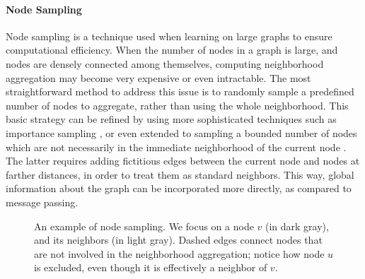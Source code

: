 \paragraph{Node Sampling}
Node sampling is a technique used when learning on large graphs to ensure computational efficiency. When the number of nodes in a graph is large, and nodes are densely connected among themselves, computing neighborhood aggregation may become very expensive or even intractable. The most straightforward method to address this issue is to randomly sample a predefined number of nodes to aggregate, rather than using the whole neighborhood. This basic strategy can be refined by using more sophisticated techniques such as importance sampling \citep{gallicchio2020fastdeepgnn}, or even extended to sampling a bounded number of nodes which are not necessarily in the immediate neighborhood of the current node \citep{hamilton2017graphsage}. The latter requires adding fictitious edges between the current node and nodes at farther distances, in order to treat them as standard neighbors. This way, global information about the graph can be incorporated more directly, as compared to message passing.

\begin{figure*}[h!]
    \centering
    \resizebox{.35\textwidth}{!}{}
    \caption{An example of node sampling. We focus on a node $v$ (in dark gray), and its neighbors (in light gray). Dashed edges connect nodes that are not involved in the neighborhood aggregation; notice how node $u$ is excluded, even though it is effectively a neighbor of $v$.}
    \label{fig:sampling}
\end{figure*}

